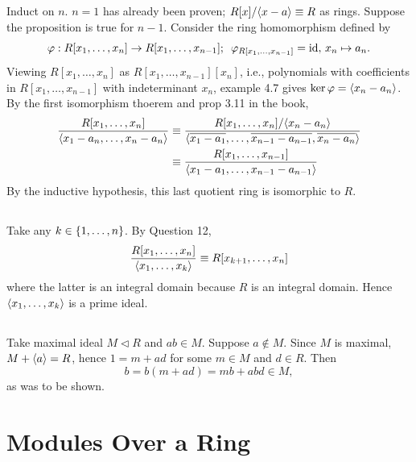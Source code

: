 \documentclass[12pt]{article}
\begin{document}
\subsection{}
Induct on $n$. 
$n = 1$ has already been proven; 
$R[x] / \<x - a\> \equiv R$ as rings. 
Suppose the proposition is true for $n - 1$. 
Consider the ring homomorphism defined by 
$$\varphi: R[x_1, \ldots, x_n] \rightarrow R[x_1, \ldots, x_{n-1}]; \hspace{0.5em} \varphi_{R[x_1, \ldots, x_{n - 1}]} = \text{id}, \, x_n \mapsto a_n.$$
Viewing $R[x_1, \ldots, x_n]$ as $R[x_1, \ldots, x_{n - 1}][x_n]$, i.e., polynomials with coefficients in $R[x_1, \ldots, x_{n - 1}]$ with indeterminant $x_n$, example 4.7 gives $\ker \varphi = \langle x_n - a_n\rangle$.
By the first isomorphism thoerem and prop 3.11 in the book,
\begin{align*}
  \frac{R[x_1, \ldots, x_n]}{\<x_1 - a_n, \ldots, x_n - a_n\>} 
  & \equiv \frac{R[x_1, \ldots, x_n] / \<x_n - a_n\>}{\<\overline{x_1 - a_1}, \ldots, \overline{x_{n - 1} - a_{n - 1}}, \overline{x_{n} - a_n}\>} \\ 
  & \equiv \frac{R[x_1, \ldots, x_{n - 1}]}{\<x_1 - a_1, \ldots, x_{n - 1} - a_{n - 1}\>}
\end{align*}
By the inductive hypothesis, this last quotient ring is isomorphic to $R$. 

\subsection{} 
Take any $k \in \{1, \ldots, n\}$. 
By Question 12, 
$$\frac{R[x_1, \ldots, x_n]}{\<x_1, \ldots, x_k\>} \equiv R[x_{k + 1}, \ldots, x_n]$$
where the latter is an integral domain because $R$ is an integral domain. 
Hence $\langle x_1, \ldots, x_{k}\rangle$ is a prime ideal. 

\subsection{} 
Take maximal ideal $M \lhd R$ and $ab \in M$. 
Suppose $a \notin M$. 
Since $M$ is maximal, $M + \langle a\rangle = R$, hence $1 = m + ad$ for some $m \in M$ and $d \in R$. 
Then
$$b = b(m + ad) = mb + abd \in M,$$
as was to be shown. 

\section{Modules Over a Ring} 
\newcommand{\cat}{R\textsf{-Mod}}
\setcounter{subsection}{8}
\end{document}
